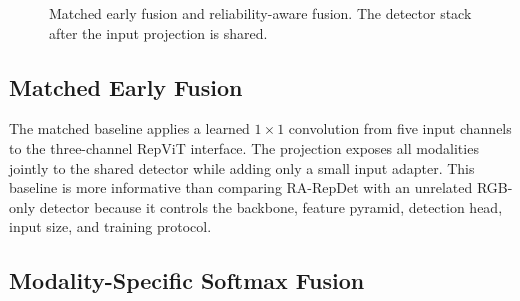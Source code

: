 \begin{figure}[t]
\centering
{}
\caption{Matched early fusion and reliability-aware fusion. The detector stack after the input projection is shared.}
\label{fig:fig-1-overall-architecture-and-training-inference-flow}
\end{figure}

\subsection{Matched Early Fusion}

The matched baseline applies a learned $1\times1$ convolution from five input channels to the three-channel RepViT interface. The projection exposes all modalities jointly to the shared detector while adding only a small input adapter. This baseline is more informative than comparing RA-RepDet with an unrelated RGB-only detector because it controls the backbone, feature pyramid, detection head, input size, and training protocol.

\subsection{Modality-Specific Softmax Fusion}

